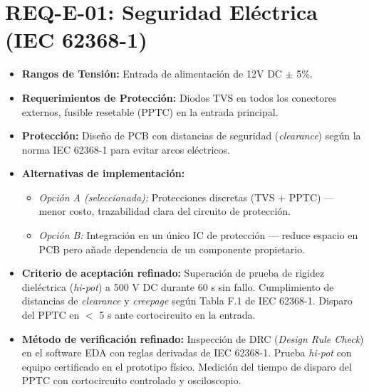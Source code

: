 \documentclass[%
	paper=a4,
	twoside=false,
	parskip=half,
	chapterprefix=false,
	10pt,
	headings=normal,
	bibliography=totoc,
	listof=totoc,
	titlepage=on,
	captions=tableabove,
	draft=false,
]{scrbook}%
\begin{document}
\section{REQ-E-01: Seguridad Eléctrica (IEC 62368-1)}
\begin{itemize}
    \item \textbf{Rangos de Tensión:} Entrada de alimentación de 12V DC $\pm$ 5\%.
    \item \textbf{Requerimientos de Protección:} Diodos TVS en todos los conectores externos, fusible resetable (PPTC) en la entrada principal.
    \item \textbf{Protección:} Diseño de PCB con distancias de seguridad (\textit{clearance}) según la norma IEC 62368-1 para evitar arcos eléctricos.
    \item \textbf{Alternativas de implementación:}
        \begin{itemize}
            \item \textit{Opción A (seleccionada):} Protecciones discretas (TVS + PPTC) — menor costo, trazabilidad clara del circuito de protección.
            \item \textit{Opción B:} Integración en un único IC de protección — reduce espacio en PCB pero añade dependencia de un componente propietario.
        \end{itemize}
    \item \textbf{Criterio de aceptación refinado:} Superación de prueba de rigidez dieléctrica (\textit{hi-pot}) a 500 V DC durante 60 s sin fallo. Cumplimiento de distancias de \textit{clearance} y \textit{creepage} según Tabla F.1 de IEC 62368-1. Disparo del PPTC en $<$ 5 s ante cortocircuito en la entrada.
    \item \textbf{Método de verificación refinado:} Inspección de DRC (\textit{Design Rule Check}) en el software EDA con reglas derivadas de IEC 62368-1. Prueba \textit{hi-pot} con equipo certificado en el prototipo físico. Medición del tiempo de disparo del PPTC con cortocircuito controlado y osciloscopio.
\end{itemize}

\end{document}
